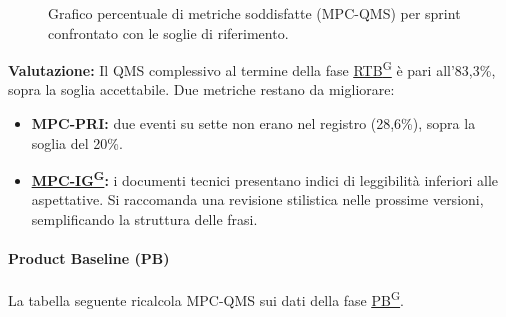\documentclass[a4paper,12pt]{article}
\providecommand{\glslink}[2]{\href{https://alittlebyte-19.github.io/Documentazione/glossario.html\#gls-#1}{\underline{#2}\textsuperscript{\scriptsize G}}}
\begin{document}
\begin{figure}[H]
\caption{Grafico percentuale di metriche soddisfatte (MPC-QMS) per sprint confrontato con le soglie di riferimento.}
\end{figure}

\noindent\textbf{Valutazione:} Il QMS complessivo al termine della fase \glslink{rtb-requirements-and-technology-baseline}{RTB} è pari all'83,3\%, sopra la soglia accettabile. Due metriche restano da migliorare:
\begin{itemize}
    \item \textbf{MPC-PRI:} due eventi su sette non erano nel registro (28,6\%), sopra la soglia del 20\%.
    \item \textbf{\glslink{indice-di-gulpease-mpc-ig}{MPC-IG}:} i documenti tecnici presentano indici di leggibilità inferiori alle aspettative. Si raccomanda una revisione stilistica nelle prossime versioni, semplificando la struttura delle frasi.
\end{itemize}

\paragraph*{Product Baseline (PB)} La tabella seguente ricalcola MPC-QMS sui dati della fase \glslink{pb-product-baseline}{PB}.
\end{document}
